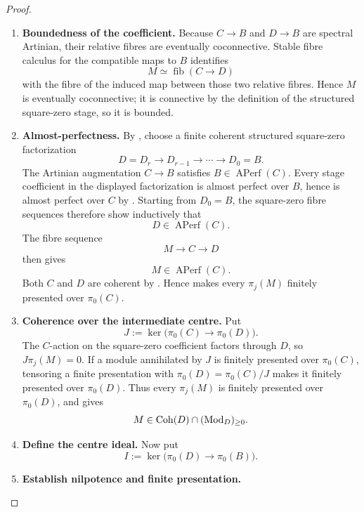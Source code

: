 \begin{proof}
\leavevmode
\begin{enumerate}[label=\textup{(\arabic*)}]
    \item \textbf{Boundedness of the coefficient.}
    Because \(C\to B\) and \(D\to B\) are spectral Artinian, their relative
    fibres are eventually coconnective. Stable fibre calculus for the compatible
    maps to \(B\) identifies
    \[
        M\simeq\operatorname{fib}(C\to D)
    \]
    with the fibre of the induced map between those two relative fibres. Hence
    \(M\) is eventually coconnective; it is connective by the definition of the
    structured square-zero stage, so it is bounded.
    \item \textbf{Almost-perfectness.}
    By , choose a finite coherent structured square-zero factorization
    \[
        D=D_r\longrightarrow D_{r-1}\longrightarrow\cdots\longrightarrow D_0=B.
    \]
    The Artinian augmentation \(C\to B\) satisfies
    \(B\in\operatorname{APerf}(C)\). Every stage coefficient in the displayed
    factorization is almost perfect over \(B\), hence is almost perfect over
    \(C\) by . Starting from
    \(D_0=B\), the square-zero fibre sequences therefore show inductively that
    \[
        D\in\operatorname{APerf}(C).
    \]
    The fibre sequence
    \[
        M\longrightarrow C\longrightarrow D
    \]
    then gives
    \[
        M\in\operatorname{APerf}(C).
    \]
    Both \(C\) and \(D\) are coherent by
    . Hence
     makes every
    \(\pi_j(M)\) finitely presented over \(\pi_0(C)\).
    \item \textbf{Coherence over the intermediate centre.}
    Put
    \[
        J:=\ker\bigl(\pi_0(C)\to\pi_0(D)\bigr).
    \]
    The \(C\)-action on the square-zero coefficient factors through \(D\), so
    \(J\pi_j(M)=0\). If a module annihilated by \(J\) is finitely presented over
    \(\pi_0(C)\), tensoring a finite presentation with
    \(\pi_0(D)=\pi_0(C)/J\) makes it finitely presented over \(\pi_0(D)\).
    Thus every \(\pi_j(M)\) is finitely presented over \(\pi_0(D)\), and
     gives
    \[
        M\in\operatorname{Coh}(D)\cap(\operatorname{Mod}_D)_{\geq0}.
    \]
    \item \textbf{Define the centre ideal.}
    Now put
    \[
        I:=\ker\bigl(\pi_0(D)\to\pi_0(B)\bigr).
    \]
    \item \textbf{Establish nilpotence and finite presentation.}

\end{enumerate}
\end{proof}
